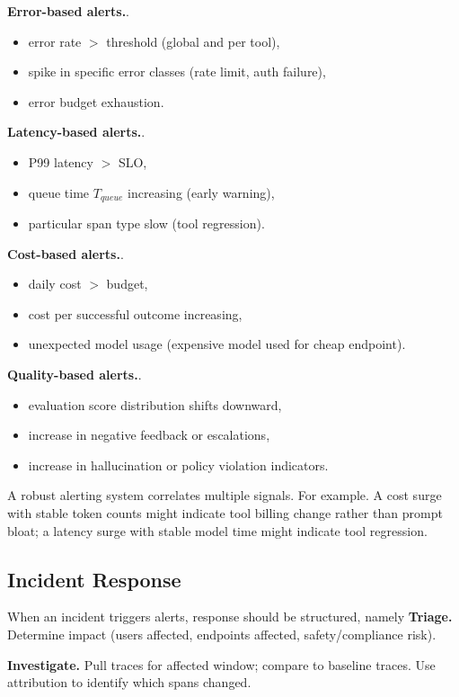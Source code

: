 \textbf{Error-based alerts.}.
\begin{itemize}
\item error rate $>$ threshold (global and per tool),
\item spike in specific error classes (rate limit, auth failure),
\item error budget exhaustion.
\end{itemize}

\textbf{Latency-based alerts.}.
\begin{itemize}
\item P99 latency $>$ SLO,
\item queue time $T_{queue}$ increasing (early warning),
\item particular span type slow (tool regression).
\end{itemize}

\textbf{Cost-based alerts.}.
\begin{itemize}
\item daily cost $>$ budget,
\item cost per successful outcome increasing,
\item unexpected model usage (expensive model used for cheap endpoint).
\end{itemize}

\textbf{Quality-based alerts.}.
\begin{itemize}
\item evaluation score distribution shifts downward,
\item increase in negative feedback or escalations,
\item increase in hallucination or policy violation indicators.
\end{itemize}

A robust alerting system correlates multiple signals. For example. A cost surge with stable token counts might indicate tool billing change rather than prompt bloat; a latency surge with stable model time might indicate tool regression.

\subsection{Incident Response}

When an incident triggers alerts, response should be structured, namely \textbf{Triage.} Determine impact (users affected, endpoints affected, safety/compliance risk).

\textbf{Investigate.} Pull traces for affected window; compare to baseline traces. Use attribution to identify which spans changed.

